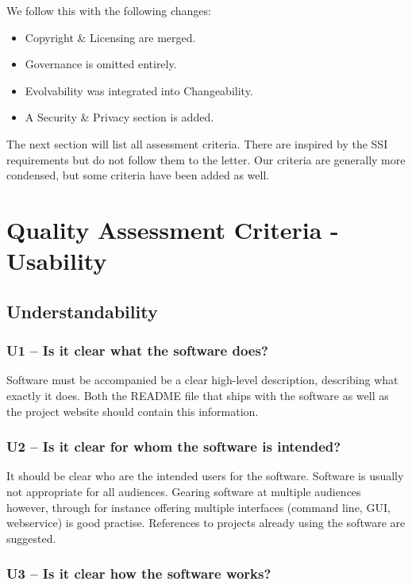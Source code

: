 \documentclass[a4paper,11pt]{article}
\begin{document}
We follow this with the following changes:

\begin{itemize}
\item Copyright \& Licensing are merged.
\item Governance is omitted entirely.
\item Evolvability was integrated into Changeability.
\item A Security \& Privacy section is added.
\end{itemize}

The next section will list all assessment criteria. There are inspired by the
SSI requirements but do not follow them to the letter. Our criteria are
generally more condensed, but some criteria have been added as well.

\section{Quality Assessment Criteria - Usability}

\subsection{Understandability}

\subsubsection{U1 -- Is it clear what the software does?}

Software must be accompanied be a clear high-level description, describing what
exactly it does. Both the README file that ships with the software as well as
the project website should contain this information. 

\subsubsection{U2 -- Is it clear for whom the software is intended?}

It should be clear who are the intended users for the software. Software is
usually not appropriate for all audiences. Gearing software at multiple
audiences however, through for instance offering multiple interfaces (command
line, GUI, webservice) is good practise. References to projects already using the
software are suggested.

\subsubsection{U3 -- Is it clear how the software works?}
\end{document}
